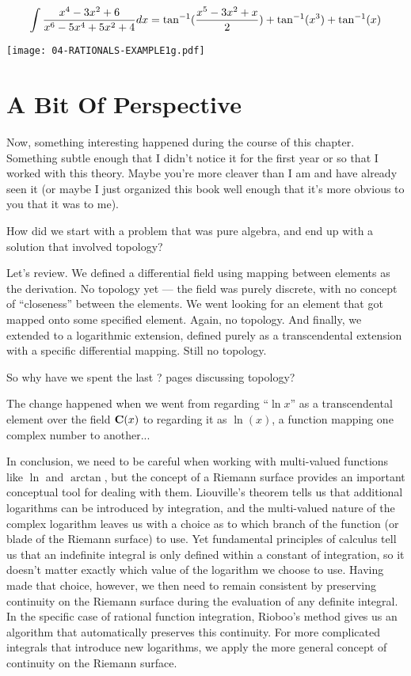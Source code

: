 
$$\int {{x^4-3x^2+6}\over{x^6-5x^4+5x^2+4}} dx =
\tan^{-1}({{x^5-3x^2+x}\over2}) + \tan^{-1}(x^3) + \tan^{-1}(x)$$

\begin{center}
\texttt{[image: 04-RATIONALS-EXAMPLE1g.pdf]}
\end{center}

\vfill\eject


\section{A Bit Of Perspective}

Now, something interesting happened during the course of this chapter.
Something subtle enough that I didn't notice it for the first year or
so that I worked with this theory.  Maybe you're more cleaver than I
am and have already seen it (or maybe I just organized this book well
enough that it's more obvious to you that it was to me).

How did we start with a problem that was pure algebra, and end up with
a solution that involved topology?

Let's review.  We defined a differential field using mapping between
elements as the derivation.  No topology yet --- the field was purely
discrete, with no concept of ``closeness'' between the elements.  We
went looking for an element that got mapped onto some specified
element.  Again, no topology.  And finally, we extended to a
logarithmic extension, defined purely as a transcendental extension
with a specific differential mapping.  Still no topology.

So why have we spent the last ? pages discussing topology?

The change happened when we went from regarding ``$\ln x$'' as a
transcendental element over the field ${\bf C}(x)$ to regarding it as
$\ln(x)$, a function mapping one complex number to another...


In conclusion, we need to be careful when working with multi-valued
functions like $\ln$ and $\arctan$, but the concept of a Riemann
surface provides an important conceptual tool for dealing with them.
Liouville's theorem tells us that additional logarithms can be
introduced by integration, and the multi-valued nature of the complex
logarithm leaves us with a choice as to which branch of the function
(or blade of the Riemann surface) to use.  Yet fundamental principles
of calculus tell us that an indefinite integral is only defined within
a constant of integration, so it doesn't matter exactly which value of
the logarithm we choose to use.  Having made that choice, however, we
then need to remain consistent by preserving continuity on the Riemann
surface during the evaluation of any definite integral.  In the
specific case of rational function integration, Rioboo's method gives
us an algorithm that automatically preserves this continuity.  For
more complicated integrals that introduce new logarithms, we apply
the more general concept of continuity on the Riemann surface.

